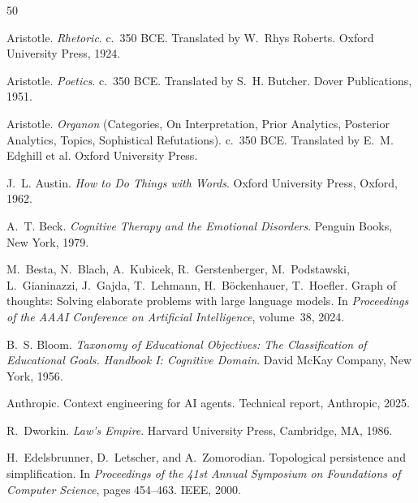 \documentclass[12pt,a4paper]{article}
\begin{document}
\begin{thebibliography}{50}

Aristotle.
\newblock \emph{Rhetoric}.
\newblock c.~350 BCE.
\newblock Translated by W.~Rhys Roberts. Oxford University Press, 1924.

Aristotle.
\newblock \emph{Poetics}.
\newblock c.~350 BCE.
\newblock Translated by S.~H. Butcher. Dover Publications, 1951.

Aristotle.
\newblock \emph{Organon} (Categories, On Interpretation, Prior Analytics, Posterior Analytics, Topics, Sophistical Refutations).
\newblock c.~350 BCE.
\newblock Translated by E.~M. Edghill et al. Oxford University Press.

J.~L. Austin.
\newblock \emph{How to Do Things with Words}.
\newblock Oxford University Press, Oxford, 1962.

A.~T. Beck.
\newblock \emph{Cognitive Therapy and the Emotional Disorders}.
\newblock Penguin Books, New York, 1979.

M.~Besta, N.~Blach, A.~Kubicek, R.~Gerstenberger, M.~Podstawski, L.~Gianinazzi, J.~Gajda, T.~Lehmann, H.~B\"ockenhauer, T.~Hoefler.
\newblock Graph of thoughts: Solving elaborate problems with large language models.
\newblock In \emph{Proceedings of the AAAI Conference on Artificial Intelligence}, volume~38, 2024.

B.~S. Bloom.
\newblock \emph{Taxonomy of Educational Objectives: The Classification of Educational Goals. Handbook I: Cognitive Domain}.
\newblock David McKay Company, New York, 1956.

Anthropic.
\newblock Context engineering for AI agents.
\newblock Technical report, Anthropic, 2025.

R.~Dworkin.
\newblock \emph{Law's Empire}.
\newblock Harvard University Press, Cambridge, MA, 1986.

H.~Edelsbrunner, D.~Letscher, and A.~Zomorodian.
\newblock Topological persistence and simplification.
\newblock In \emph{Proceedings of the 41st Annual Symposium on Foundations of Computer Science}, pages 454--463. IEEE, 2000.


\end{thebibliography}
\end{document}
